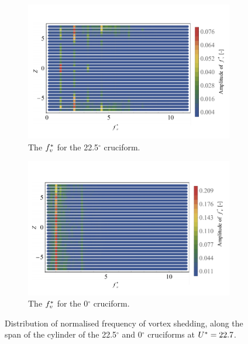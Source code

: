 \documentclass[oneside]{utmthesis}
\begin{document}
\begin{figure}[H]
  \centering

  \begin{subfigure}[h]{1\textwidth}
    \includegraphics[width=\textwidth]{figs/probe225YU10}
    \caption{The $f^{*}_{v}$ for the 22.5$^{\circ}$ cruciform.}
    \label{fig:probe225YU10}
  \end{subfigure}

  \begin{subfigure}[h]{1\textwidth}
    \includegraphics[width=\textwidth]{figs/probe00YU10}
    \caption{The $f^{*}_{v}$ for the 0$^{\circ}$ cruciform.}
    \label{fig:probe00YU10}
  \end{subfigure}

  \caption{Distribution of normalised frequency of vortex shedding, along the span of the cylinder of the 22.5$^{\circ}$ and 0$^{\circ}$ cruciforms at $U^{*} = 22.7$.}
  \label{fig:probe22500YU10}
\end{figure}
\end{document}
